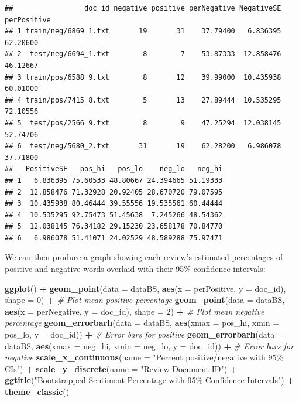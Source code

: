 \documentclass[
]{book}
\newenvironment{Shaded}{\begin{snugshade}}{\end{snugshade}}
\newcommand{\AttributeTok}[1]{\textcolor[rgb]{0.13,0.29,0.53}{#1}}
\newcommand{\CommentTok}[1]{\textcolor[rgb]{0.56,0.35,0.01}{\textit{#1}}}
\newcommand{\DecValTok}[1]{\textcolor[rgb]{0.00,0.00,0.81}{#1}}
\newcommand{\FunctionTok}[1]{\textcolor[rgb]{0.13,0.29,0.53}{\textbf{#1}}}
\newcommand{\NormalTok}[1]{#1}
\newcommand{\SpecialCharTok}[1]{\textcolor[rgb]{0.81,0.36,0.00}{\textbf{#1}}}
\newcommand{\StringTok}[1]{\textcolor[rgb]{0.31,0.60,0.02}{#1}}
\begin{document}
\begin{verbatim}
##                 doc_id negative positive perNegative NegativeSE perPositive
## 1 train/neg/6869_1.txt       19       31    37.79400   6.836395    62.20600
## 2  test/neg/6694_1.txt        8        7    53.87333  12.858476    46.12667
## 3 train/pos/6588_9.txt        8       12    39.99000  10.435938    60.01000
## 4 train/pos/7415_8.txt        5       13    27.89444  10.535295    72.10556
## 5  test/pos/2566_9.txt        8        9    47.25294  12.038145    52.74706
## 6  test/neg/5680_2.txt       31       19    62.28200   6.986078    37.71800
##   PositiveSE   pos_hi   pos_lo    neg_lo   neg_hi
## 1   6.836395 75.60533 48.80667 24.394665 51.19333
## 2  12.858476 71.32928 20.92405 28.670720 79.07595
## 3  10.435938 80.46444 39.55556 19.535561 60.44444
## 4  10.535295 92.75473 51.45638  7.245266 48.54362
## 5  12.038145 76.34182 29.15230 23.658178 70.84770
## 6   6.986078 51.41071 24.02529 48.589288 75.97471
\end{verbatim}

We can then produce a graph showing each review's estimated percentages of positive and negative words overlaid with their 95\% confidence intervals:

\begin{Shaded}
\begin{Highlighting}[]
\FunctionTok{ggplot}\NormalTok{() }\SpecialCharTok{+}
 \FunctionTok{geom\_point}\NormalTok{(}\AttributeTok{data =}\NormalTok{ dataBS, }\FunctionTok{aes}\NormalTok{(}\AttributeTok{x =}\NormalTok{ perPositive, }\AttributeTok{y =}\NormalTok{ doc\_id), }\AttributeTok{shape =} \DecValTok{0}\NormalTok{) }\SpecialCharTok{+} \CommentTok{\# Plot mean positive percentage}
 \FunctionTok{geom\_point}\NormalTok{(}\AttributeTok{data =}\NormalTok{ dataBS, }\FunctionTok{aes}\NormalTok{(}\AttributeTok{x =}\NormalTok{ perNegative, }\AttributeTok{y =}\NormalTok{ doc\_id), }\AttributeTok{shape =} \DecValTok{2}\NormalTok{) }\SpecialCharTok{+} \CommentTok{\# Plot mean negative percentage}
 \FunctionTok{geom\_errorbarh}\NormalTok{(}\AttributeTok{data =}\NormalTok{ dataBS, }\FunctionTok{aes}\NormalTok{(}\AttributeTok{xmax =}\NormalTok{ pos\_hi, }\AttributeTok{xmin =}\NormalTok{ pos\_lo, }\AttributeTok{y =}\NormalTok{ doc\_id)) }\SpecialCharTok{+} \CommentTok{\# Error bars for positive}
 \FunctionTok{geom\_errorbarh}\NormalTok{(}\AttributeTok{data =}\NormalTok{ dataBS, }\FunctionTok{aes}\NormalTok{(}\AttributeTok{xmax =}\NormalTok{ neg\_hi, }\AttributeTok{xmin =}\NormalTok{ neg\_lo, }\AttributeTok{y =}\NormalTok{ doc\_id)) }\SpecialCharTok{+} \CommentTok{\# Error bars for negative}
 \FunctionTok{scale\_x\_continuous}\NormalTok{(}\AttributeTok{name =} \StringTok{"Percent positive/negative with 95\% CIs"}\NormalTok{) }\SpecialCharTok{+}
 \FunctionTok{scale\_y\_discrete}\NormalTok{(}\AttributeTok{name =} \StringTok{"Review Document ID"}\NormalTok{) }\SpecialCharTok{+} 
 \FunctionTok{ggtitle}\NormalTok{(}\StringTok{"Bootstrapped Sentiment Percentage with 95\% Confidence Intervals"}\NormalTok{) }\SpecialCharTok{+}
 \FunctionTok{theme\_classic}\NormalTok{()}
\end{Highlighting}
\end{Shaded}
\end{document}
